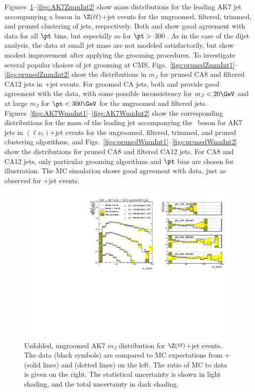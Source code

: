 Figures~\ref{figs:AK7ZmmInt1}--\ref{figs:AK7ZmmInt2} show mass
distributions for the leading AK7 jet accompanying a \Z boson in
$\Z(\ell\ell)$+jet events for the ungroomed, filtered, trimmed,
and pruned clustering of jets, respectively. Both \PYTHIA and
\HERWIG show good agreement with data for all $\pt$ bins, but
especially so for $\pt >$ 300 \GeV. As in the case of the dijet
analysis, the data at small jet mass are not modeled satisfactorily, but
show modest improvement after applying the grooming procedures.
To investigate several popular choices of jet grooming at CMS,
Figs.~\ref{figs:prunedZmmInt1}--\ref{figs:prunedZmmInt2} show the
distributions in $m_J$ for pruned CA8 and filtered CA12 jets in {\Z}$+$jet
events.  For groomed CA jets, both  \PYTHIA and \HERWIG provide
good agreement with the data, with some possible inconsistency for
$m_J< 20 \GeV$ and at large $m_J$ for $\pt< 300 \GeV$ for the ungroomed and
filtered jets.
Figures~\ref{figs:AK7WmnInt1}--\ref{figs:AK7WmnInt2} show the
corresponding distributions for the mass of the leading jet
accompanying the \PW~boson for AK7 jets in \PW$(\ell\nu_\ell)$+jet
events for the ungroomed, filtered, trimmed, and pruned clustering
algorithms, and
Figs.~\ref{figs:prunedWmnInt1}--\ref{figs:prunedWmnInt2} show the
distributions for pruned CA8 and filtered CA12 jets.
For CA8 and CA12 jets, only particular grooming algorithms and $\pt$ bins are chosen for illustration.
The MC simulation shows good agreement with data, just as observed for 
{\Z}$+$jet events. 


\begin{figure}[!htb]
\includegraphics[width=0.99\textwidth]{figs/Zll/jetmassunf_ak7_log_Z.pdf}
\caption{Unfolded, ungroomed AK7 $m_J$ distribution for $\Z(\ell\ell)$+jet events. The data (black symbols) are compared to MC expectations from {\MADGRAPH}+\PYTHIA (solid lines) and \HERWIG (dotted lines) on the left. The ratio of MC to data is given on the right.
The statistical uncertainty is shown in light shading, and the total uncertainty in dark shading.}
\label{figs:AK7ZmmInt1}
\end{figure}

